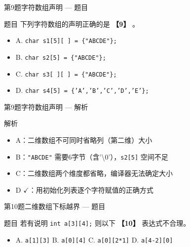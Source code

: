 \begin{frame}{第9题}{字符数组声明 — 题目}
    \begin{exampleblock}{题目}
        \small 下列字符数组的声明正确的是 \textbf{【9】} 。
        \begin{itemize}
            \item A. \texttt{char s1[5][ ] = \{"ABCDE"\};}
            \item B. \texttt{char s2[5] = \{"ABCDE"\};}
            \item C. \texttt{char s3[ ][ ] = \{"ABCDE"\};}
            \item D. \texttt{char s4[5] = \{'A','B','C','D','E'\};}
        \end{itemize}
    \end{exampleblock}
\end{frame}

\begin{frame}{第9题}{字符数组声明 — 解析}
    \begin{alertblock}{解析}
        \small
        \begin{itemize}
            \setlength{\itemsep}{0pt}
            \item A：二维数组不可同时省略列（第二维）大小
            \item B：\texttt{"ABCDE"} 需要6字节（含'\textbackslash 0'），\texttt{s2[5]} 空间不足
            \item C：二维数组两个维度都省略，编译器无法确定大小
            \item {\color{highlight}D $\checkmark$：用初始化列表逐个字符赋值的正确方式}
        \end{itemize}
    \end{alertblock}
\end{frame}

\begin{frame}{第10题}{二维数组下标越界 --- 题目}
    \begin{exampleblock}{题目}
        \small 若有说明 \texttt{int a[3][4];} 则以下 \textbf{【10】} 表达式不合理。
        \begin{itemize}
            \setlength{\itemsep}{0pt}
            \item A. \texttt{a[1][3]} \quad B. \texttt{a[0][4]} \quad C. \texttt{a[0][2*1]} \quad D. \texttt{a[4-2][0]}
        \end{itemize}
    \end{exampleblock}
\end{frame}

